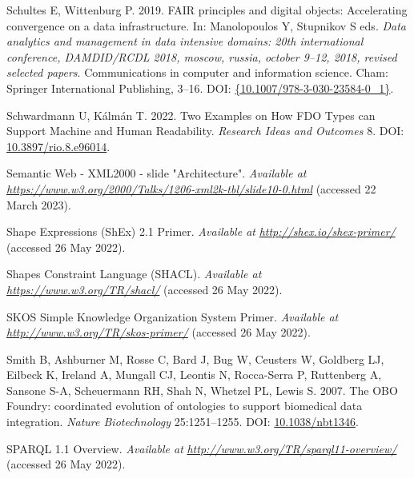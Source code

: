 \begin{CSLReferences}{1}{0}
\leavevmode{}%
Schultes E, Wittenburg P. 2019. FAIR principles and digital objects: Accelerating convergence on a data infrastructure. In: Manolopoulos Y, Stupnikov S eds. \emph{Data analytics and management in data intensive domains: 20th international conference, DAMDID/RCDL 2018, moscow, russia, october 9--12, 2018, revised selected papers}. Communications in computer and information science. Cham: Springer International Publishing, 3--16. DOI: \href{https://doi.org/\%7B10.1007/978-3-030-23584-0_1\%7D}{\{10.1007/978-3-030-23584-0\_1\}}.

\leavevmode{}%
Schwardmann U, Kálmán T. 2022. Two Examples on How FDO Types can Support Machine and Human Readability. \emph{Research Ideas and Outcomes} 8. DOI: \href{https://doi.org/10.3897/rio.8.e96014}{10.3897/rio.8.e96014}.

\leavevmode{}%
Semantic Web - XML2000 - slide "Architecture". \emph{Available at} \href{https://www.w3.org/2000/Talks/1206-xml2k-tbl/slide10-0.html}{\emph{https://www.w3.org/2000/Talks/1206-xml2k-tbl/slide10-0.html}} (accessed 22 March 2023).

\leavevmode{}%
Shape Expressions (ShEx) 2.1 Primer. \emph{Available at} \href{http://shex.io/shex-primer/}{\emph{http://shex.io/shex-primer/}} (accessed 26 May 2022).

\leavevmode{}%
Shapes Constraint Language (SHACL). \emph{Available at} \href{https://www.w3.org/TR/shacl/}{\emph{https://www.w3.org/TR/shacl/}} (accessed 26 May 2022).

\leavevmode{}%
SKOS Simple Knowledge Organization System Primer. \emph{Available at} \href{http://www.w3.org/TR/skos-primer/}{\emph{http://www.w3.org/TR/skos-primer/}} (accessed 26 May 2022).

\leavevmode{}%
Smith B, Ashburner M, Rosse C, Bard J, Bug W, Ceusters W, Goldberg LJ, Eilbeck K, Ireland A, Mungall CJ, Leontis N, Rocca-Serra P, Ruttenberg A, Sansone S-A, Scheuermann RH, Shah N, Whetzel PL, Lewis S. 2007. The OBO Foundry: coordinated evolution of ontologies to support biomedical data integration. \emph{Nature Biotechnology} 25:1251--1255. DOI: \href{https://doi.org/10.1038/nbt1346}{10.1038/nbt1346}.

\leavevmode{}%
SPARQL 1.1 Overview. \emph{Available at} \href{http://www.w3.org/TR/sparql11-overview/}{\emph{http://www.w3.org/TR/sparql11-overview/}} (accessed 26 May 2022).


\end{CSLReferences}
